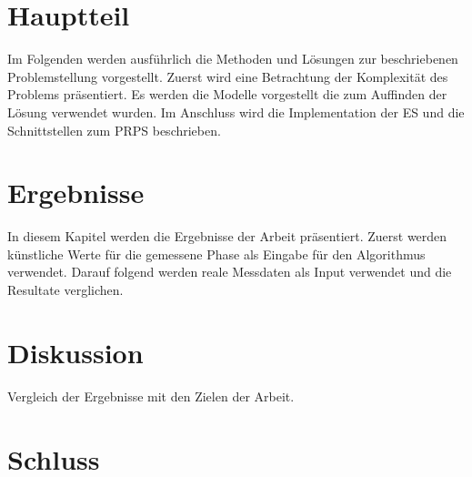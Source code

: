 \documentclass[a4paper,11pt, twoside, openright]{scrbook}
\begin{document}

%

\chapter{Hauptteil}
Im Folgenden werden ausführlich die Methoden und Lösungen zur beschriebenen Problemstellung vorgestellt. Zuerst wird eine Betrachtung der Komplexität des Problems präsentiert. Es werden die Modelle vorgestellt die zum Auffinden der Lösung verwendet wurden. Im Anschluss wird die Implementation der ES und die Schnittstellen zum PRPS beschrieben.
%

%
\chapter{Ergebnisse}
In diesem Kapitel werden die Ergebnisse der Arbeit präsentiert. Zuerst werden künstliche Werte für die gemessene Phase als Eingabe für den Algorithmus verwendet. Darauf folgend werden reale Messdaten als Input verwendet und die Resultate verglichen.\\
%

%
\chapter{Diskussion}
Vergleich der Ergebnisse mit den Zielen der Arbeit.\\
%

%
\chapter{Schluss}

%


\newpage

\nocite{*} %


\end{document}
